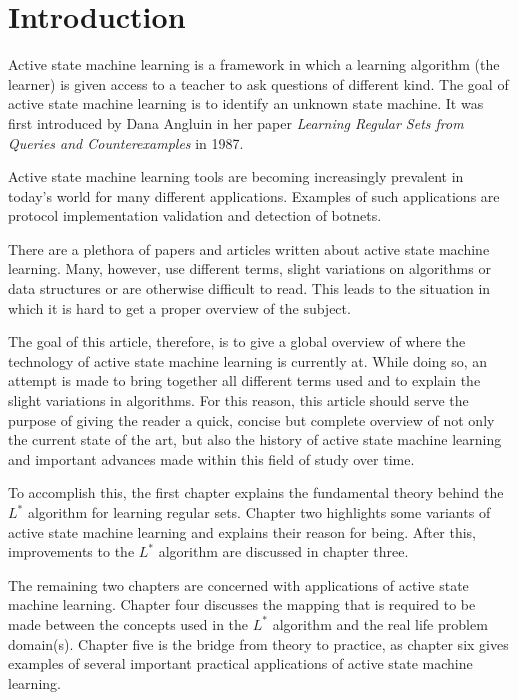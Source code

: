 \documentclass[multi,crop=false,class=article]{standalone}
\begin{document}
\section{Introduction}
\label{sec:introduction}

Active state machine learning is a framework in which a learning algorithm (the
learner) is given access to a teacher to ask questions of different kind. The
goal of active state machine learning is to identify an unknown state machine.
It was first introduced by Dana Angluin in her paper \textit{Learning Regular
Sets from Queries and Counterexamples} in 1987\cite{Angluin87}.

Active state machine learning tools are becoming increasingly prevalent in
today's world for many different applications.  Examples
of such applications are protocol implementation validation and detection of
botnets. 

There are a plethora of papers and articles written about active state machine
learning. Many, however, use different terms, slight variations on algorithms
or data structures or are otherwise difficult to read. This leads to the
situation in which it is hard to get a proper overview of the subject.

The goal of this article, therefore, is to give a global overview of where the
technology of active state machine learning is currently at. While doing so, an
attempt is made to bring together all different terms used and to explain the
slight variations in algorithms. For this reason, this article should serve the
purpose of giving the reader a quick, concise but complete overview of not only
the current state of the art, but also the history of active state machine
learning and important advances made within this field of study over time.

To accomplish this, the first chapter explains the fundamental theory behind the
$L^{*}$ algorithm for learning regular sets. Chapter two highlights some
variants of active state machine learning and explains their reason for being.
After this, improvements to the $L^{*}$ algorithm are discussed in chapter
three.

The remaining two chapters are concerned with applications of active state
machine learning. Chapter four discusses the mapping that is required to be made
between the concepts used in the $L^{*}$ algorithm and the real life problem
domain(s). Chapter five is the bridge from theory to practice, as chapter six
gives examples of several important practical applications of active state
machine learning.
\end{document}
